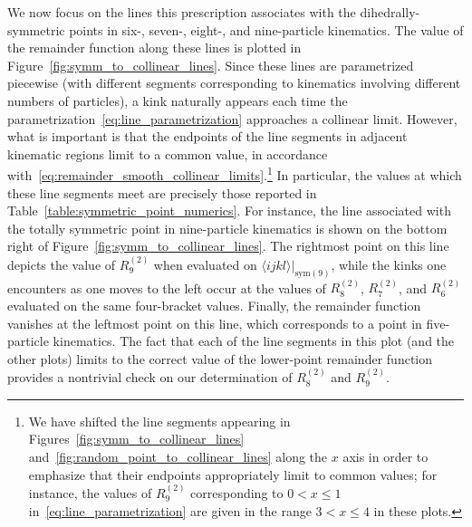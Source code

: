 \documentclass[11pt]{article}
\begin{document}
We now focus on the lines this prescription associates with the dihedrally-symmetric points in six-, seven-, eight-, and nine-particle kinematics. The value of the remainder function along these lines is plotted in Figure~\ref{fig:symm_to_collinear_lines}. Since these lines are parametrized piecewise (with different segments corresponding to kinematics involving different numbers of particles), a kink naturally appears each time the parametrization~\eqref{eq:line_parametrization} approaches a collinear limit. However, what is important is that the endpoints of the line segments in adjacent kinematic regions limit to a common value, in accordance with~\eqref{eq:remainder_smooth_collinear_limits}.\footnote{We have shifted the line segments appearing in Figures~\ref{fig:symm_to_collinear_lines} and~\ref{fig:random_point_to_collinear_lines} along the $x$ axis in order to emphasize that their endpoints appropriately limit to common values; for instance, the values of $R_9^{(2)}$\! corresponding to $0 < x \leq 1$ in~\eqref{eq:line_parametrization} are given in the range $3 < x \leq 4$ in these plots.} In particular, the values at which these line segments meet are precisely those reported in Table~\ref{table:symmetric_point_numerics}. For instance, the line associated with the totally symmetric point in nine-particle kinematics is shown on the bottom right of Figure~\ref{fig:symm_to_collinear_lines}. The rightmost point on this line depicts the value of $R_9^{(2)}$\! when evaluated on $\langle i j k l \rangle \big|_{\text{sym}(9)}$, while the kinks one encounters as one moves to the left occur at the values of $R_8^{(2)}$\!, $R_7^{(2)}$\!, and $R_6^{(2)}$\! evaluated on the same four-bracket values. Finally, the remainder function vanishes at the leftmost point on this line, which corresponds to a point in five-particle kinematics. The fact that each of the line segments in this plot (and the other plots) limits to the correct value of the lower-point remainder function provides a nontrivial check on our determination of $R_8^{(2)}$\! and $R_9^{(2)}$\!.  
\end{document}
